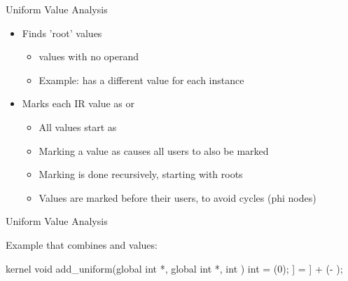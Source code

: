\begin{frame}{Uniform Value Analysis}

\begin{itemize}
    \item Finds 'root' values
    \begin{itemize}
        \item {} values with no  operand
        \item Example:  has a different value for each instance
    \end{itemize}
    \item Marks each IR value as  or 
    \begin{itemize}
        \item All values start as 
        \item Marking a value as  causes all users to also be marked 
        \item Marking is done recursively, starting with roots
        \item Values are marked before their users, to avoid cycles (phi nodes)
    \end{itemize}
\end{itemize}

\end{frame}


\begin{frame}[fragile]{Uniform Value Analysis}

Example that combines  and  values:

\begin{codebox}[commandchars=\\\[\]]
kernel void add_uniform(global int *\uniform[dst], global int *\uniform[src], int \uniform[alpha]) {
    int \varying[tid] = (0);
    \uniform[dst]\idx[\varying[tid]] = \uniform[src]\idx[\varying[tid]] + (\uniform[alpha] - \uniform[1]);
}
\end{codebox}


\end{frame}

